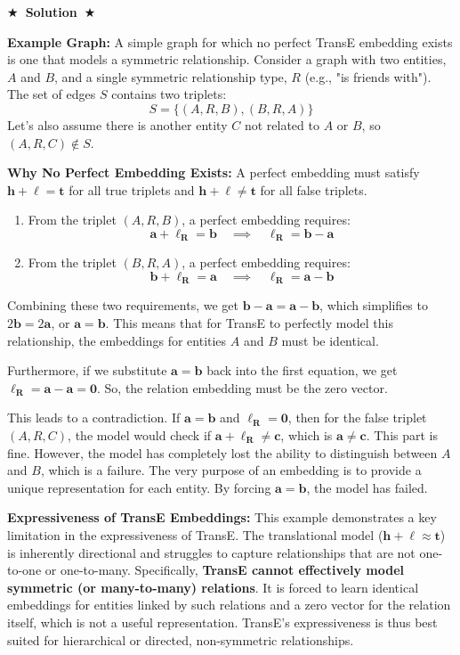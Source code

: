 \documentclass{article}
\numberwithin{figure}{section}
\newcommand{\Solution}[1]{%
    {%
        \medskip
        \color{red}
        \bf $\bigstar$~\sf\textbf{Solution}~$\bigstar$ \sf
        #1
    }
    \bigskip
}
\begin{document}
\Solution{
	\textbf{Example Graph:}
	A simple graph for which no perfect TransE embedding exists is one that models a symmetric relationship. Consider a graph with two entities, $A$ and $B$, and a single symmetric relationship type, $R$ (e.g., "is friends with"). The set of edges $S$ contains two triplets:
	\[ S = \{ (A, R, B), (B, R, A) \} \]
	Let's also assume there is another entity $C$ not related to $A$ or $B$, so $(A, R, C) \notin S$.
	
	\textbf{Why No Perfect Embedding Exists:}
	A perfect embedding must satisfy $\mathbf{h}+\boldsymbol{\ell} = \mathbf{t}$ for all true triplets and $\mathbf{h}+\boldsymbol{\ell} \neq \mathbf{t}$ for all false triplets.
	
	\begin{enumerate}
		\item From the triplet $(A, R, B)$, a perfect embedding requires:
		\[ \mathbf{a} + \boldsymbol{\ell_R} = \mathbf{b} \quad \implies \quad \boldsymbol{\ell_R} = \mathbf{b} - \mathbf{a} \]
		\item From the triplet $(B, R, A)$, a perfect embedding requires:
		\[ \mathbf{b} + \boldsymbol{\ell_R} = \mathbf{a} \quad \implies \quad \boldsymbol{\ell_R} = \mathbf{a} - \mathbf{b} \]
	\end{enumerate}
	
	Combining these two requirements, we get $\mathbf{b} - \mathbf{a} = \mathbf{a} - \mathbf{b}$, which simplifies to $2\mathbf{b} = 2\mathbf{a}$, or $\mathbf{a} = \mathbf{b}$. This means that for TransE to perfectly model this relationship, the embeddings for entities $A$ and $B$ must be identical.
	
	Furthermore, if we substitute $\mathbf{a} = \mathbf{b}$ back into the first equation, we get $\boldsymbol{\ell_R} = \mathbf{a} - \mathbf{a} = \mathbf{0}$. So, the relation embedding must be the zero vector.
	
	This leads to a contradiction. If $\mathbf{a} = \mathbf{b}$ and $\boldsymbol{\ell_R} = \mathbf{0}$, then for the false triplet $(A, R, C)$, the model would check if $\mathbf{a} + \boldsymbol{\ell_R} \neq \mathbf{c}$, which is $\mathbf{a} \neq \mathbf{c}$. This part is fine. However, the model has completely lost the ability to distinguish between $A$ and $B$, which is a failure. The very purpose of an embedding is to provide a unique representation for each entity. By forcing $\mathbf{a} = \mathbf{b}$, the model has failed.
	
	\textbf{Expressiveness of TransE Embeddings:}
	This example demonstrates a key limitation in the expressiveness of TransE. The translational model ($ \mathbf{h}+\boldsymbol{\ell} \approx \mathbf{t}$) is inherently directional and struggles to capture relationships that are not one-to-one or one-to-many. Specifically, \textbf{TransE cannot effectively model symmetric (or many-to-many) relations}. It is forced to learn identical embeddings for entities linked by such relations and a zero vector for the relation itself, which is not a useful representation. TransE's expressiveness is thus best suited for hierarchical or directed, non-symmetric relationships.
}
\end{document}
